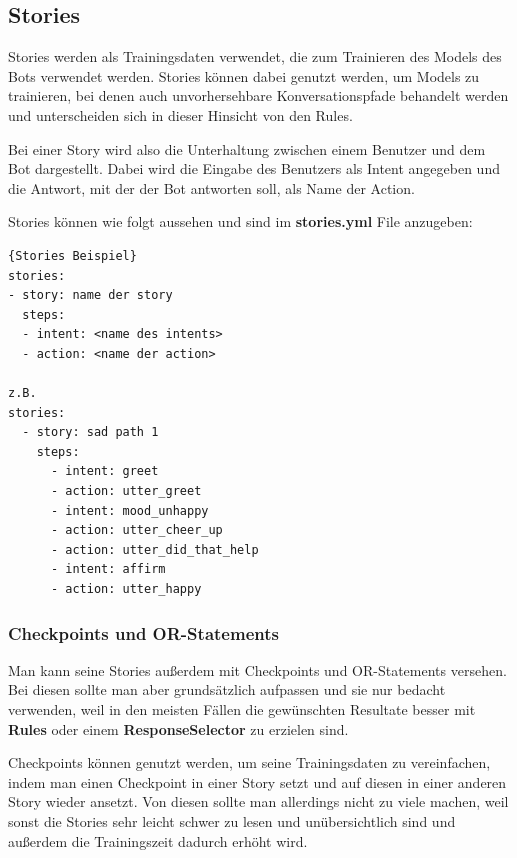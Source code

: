 \subsection{Stories}

Stories werden als Trainingsdaten verwendet, die zum Trainieren des Models des Bots verwendet werden.
Stories können dabei genutzt werden, um Models zu trainieren, bei denen auch unvorhersehbare Konversationspfade behandelt werden und unterscheiden sich in dieser Hinsicht von den Rules.\cite{stories}

Bei einer Story wird also die Unterhaltung zwischen einem Benutzer und dem Bot dargestellt.
Dabei wird die Eingabe des Benutzers als Intent angegeben und die Antwort, mit der der Bot antworten soll, als Name der Action.\cite{stories}

Stories können wie folgt aussehen und sind im \textbf{stories.yml} File anzugeben:

\begin{lstlisting}[label={lst:stories-example},caption={Stories Beispiel}]{Stories Beispiel}
stories:
- story: name der story
  steps:
  - intent: <name des intents>
  - action: <name der action>

z.B.
stories:
  - story: sad path 1
    steps:
      - intent: greet
      - action: utter_greet
      - intent: mood_unhappy
      - action: utter_cheer_up
      - action: utter_did_that_help
      - intent: affirm
      - action: utter_happy
\end{lstlisting}

\subsubsection{Checkpoints und OR-Statements}

Man kann seine Stories außerdem mit Checkpoints und OR-Statements versehen.
Bei diesen sollte man aber grundsätzlich aufpassen und sie nur bedacht verwenden, weil in den meisten Fällen die gewünschten Resultate besser mit \textbf{Rules} oder einem \textbf{ResponseSelector} zu erzielen sind.\cite{checkpointsor}

Checkpoints können genutzt werden, um seine Trainingsdaten zu vereinfachen, indem man einen Checkpoint in einer Story setzt und auf diesen in einer anderen Story wieder ansetzt.
Von diesen sollte man allerdings nicht zu viele machen, weil sonst die Stories sehr leicht schwer zu lesen und unübersichtlich sind und außerdem die Trainingszeit dadurch erhöht wird.\cite{checkpoints}

